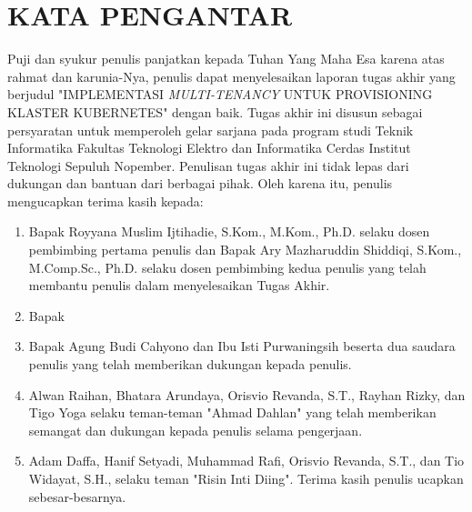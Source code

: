 \chapter*{KATA PENGANTAR}


\vspace{2ex}


Puji dan syukur penulis panjatkan kepada Tuhan Yang Maha Esa karena atas rahmat
dan karunia-Nya, penulis dapat menyelesaikan laporan tugas akhir yang berjudul
"IMPLEMENTASI \emph{MULTI-TENANCY} UNTUK PROVISIONING KLASTER KUBERNETES" dengan
baik. Tugas akhir ini disusun sebagai persyaratan untuk memperoleh gelar sarjana
pada program studi Teknik Informatika Fakultas Teknologi Elektro dan Informatika
Cerdas Institut Teknologi Sepuluh Nopember. Penulisan tugas akhir ini tidak lepas
dari dukungan dan bantuan dari berbagai pihak.
Oleh karena itu, penulis mengucapkan terima kasih kepada:

\begin{enumerate}[nolistsep]

  \item Bapak Royyana Muslim Ijtihadie, S.Kom., M.Kom., Ph.D. selaku dosen pembimbing
    pertama penulis dan Bapak Ary Mazharuddin Shiddiqi, S.Kom., M.Comp.Sc., Ph.D. selaku dosen
    pembimbing kedua penulis yang telah membantu penulis dalam menyelesaikan Tugas Akhir.

  \item Bapak 

  \item Bapak Agung Budi Cahyono dan Ibu Isti Purwaningsih beserta dua saudara penulis
    yang telah memberikan dukungan kepada penulis.

    
  \item Alwan Raihan, Bhatara Arundaya, Orisvio Revanda, S.T., Rayhan Rizky, dan Tigo Yoga
    selaku teman-teman "Ahmad Dahlan" yang telah memberikan semangat dan dukungan kepada
    penulis selama pengerjaan.

  \item Adam Daffa, Hanif Setyadi, Muhammad Rafi, Orisvio Revanda, S.T., dan Tio
    Widayat, S.H., selaku teman "Risin Inti Diing". Terima kasih penulis ucapkan
    sebesar-besarnya.

\end{enumerate}

